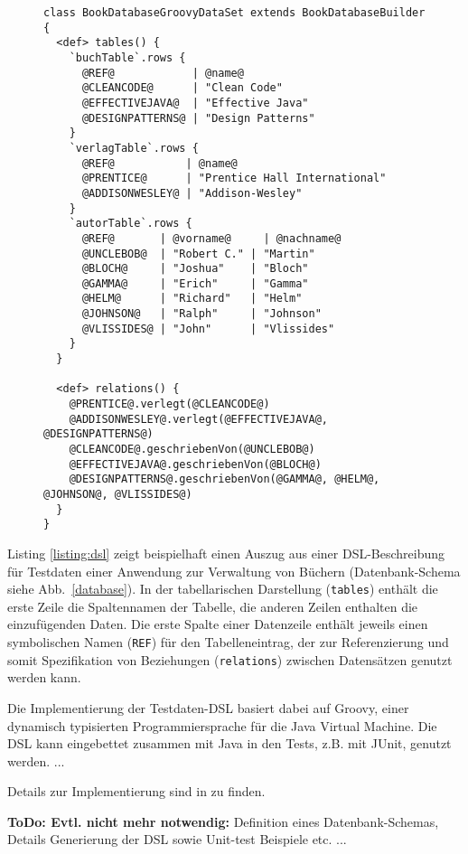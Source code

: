 \begin{figure}[tb]
\begin{lstlisting}[caption=Mittels DSL beschriebenes Testdaten-Set (Table Builder API)., style=java, label=listing:dsl]
class BookDatabaseGroovyDataSet extends BookDatabaseBuilder
{
  <def> tables() {
    `buchTable`.rows {
      @REF@            | @name@
      @CLEANCODE@      | "Clean Code"      
      @EFFECTIVEJAVA@  | "Effective Java"  
      @DESIGNPATTERNS@ | "Design Patterns" 
    }
    `verlagTable`.rows {
      @REF@           | @name@
      @PRENTICE@      | "Prentice Hall International"
      @ADDISONWESLEY@ | "Addison-Wesley"
    }
    `autorTable`.rows {
      @REF@       | @vorname@     | @nachname@
      @UNCLEBOB@  | "Robert C." | "Martin"
      @BLOCH@     | "Joshua"    | "Bloch"
      @GAMMA@     | "Erich"     | "Gamma"
      @HELM@      | "Richard"   | "Helm"
      @JOHNSON@   | "Ralph"     | "Johnson"
      @VLISSIDES@ | "John"      | "Vlissides"    
    }
  }

  <def> relations() {
    @PRENTICE@.verlegt(@CLEANCODE@)
    @ADDISONWESLEY@.verlegt(@EFFECTIVEJAVA@, @DESIGNPATTERNS@)
    @CLEANCODE@.geschriebenVon(@UNCLEBOB@)
    @EFFECTIVEJAVA@.geschriebenVon(@BLOCH@)
    @DESIGNPATTERNS@.geschriebenVon(@GAMMA@, @HELM@, @JOHNSON@, @VLISSIDES@)
  }
}
\end{lstlisting}
\end{figure}


Listing \ref{listing:dsl} zeigt beispielhaft einen Auszug aus einer DSL-Beschreibung für Testdaten einer Anwendung zur Verwaltung von Büchern (Datenbank-Schema siehe Abb.~\ref{database}). In der tabellarischen Darstellung (\texttt{tables}) enthält die erste Zeile die Spaltennamen der Tabelle, die anderen Zeilen enthalten die einzufügenden Daten. Die erste Spalte einer Datenzeile enthält jeweils einen symbolischen Namen (\texttt{REF}) für den Tabelleneintrag, der zur Referenzierung und somit Spezifikation von Beziehungen (\texttt{relations}) zwischen Datensätzen genutzt werden kann.


Die Implementierung der Testdaten-DSL basiert dabei auf Groovy, einer dynamisch typisierten Programmiersprache für die Java Virtual Machine. Die DSL kann eingebettet zusammen mit Java in den Tests, z.B. mit JUnit, genutzt werden.
...
%

Details zur Implementierung sind in \cite{MT:Moll:2013} zu finden.

\textbf{ToDo: Evtl. nicht mehr notwendig:} Definition eines Datenbank-Schemas, Details Generierung der DSL sowie Unit-test Beispiele etc. ...



